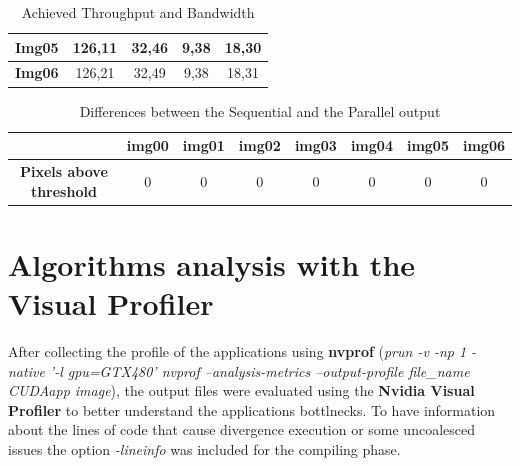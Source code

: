 \documentclass[a4paper]{article}
\begin{document}
\begin{table}[!ht]
\begin{tabular}{|c|c|c|c|c|}
\textbf{Img05}  & 126,11                                                                        & 32,46                                                                    & 9,38                                                                        & 18,30                                                                         \\ \hline
\textbf{Img06}  & 126,21                                                                        & 32,49                                                                    & 9,38                                                                        & 18,31                                                                         \\ \hline
\end{tabular}
\caption{Achieved Throughput and Bandwidth}
\label{tab:smooth-abt}
\end{table}
\FloatBarrier

\begin{table}[!ht]
\centering
\begin{tabular}{|c|l|c|c|l|l|l|l|}
\hline
\textbf{}                        & \textbf{img00}         & \textbf{img01} & \textbf{img02} & \textbf{img03}         & \textbf{img04}         & \textbf{img05}         & \textbf{img06}         \\ \hline
\textbf{Pixels above  threshold} & \multicolumn{1}{c|}{0} & 0              & 0              & \multicolumn{1}{c|}{0} & \multicolumn{1}{c|}{0} & \multicolumn{1}{c|}{0} & \multicolumn{1}{c|}{0} \\ \hline
\end{tabular}
\caption{Differences between the Sequential and the Parallel output}
\label{tab:pxabs}
\end{table}
\FloatBarrier

\newpage

\section{Algorithms analysis with the Visual Profiler}
\label{sec:vp}
After collecting the profile of the applications using \textbf{nvprof} (\textit{prun -v -np 1 -native '-l gpu=GTX480' nvprof --analysis-metrics --output-profile file\_name CUDAapp image}), the output files were evaluated using the \textbf{Nvidia Visual Profiler} to better understand the applications bottlnecks. To have information about the lines of code that cause divergence execution or some uncoalesced issues the option \textit{-lineinfo} was included for the compiling phase.
\end{document}
